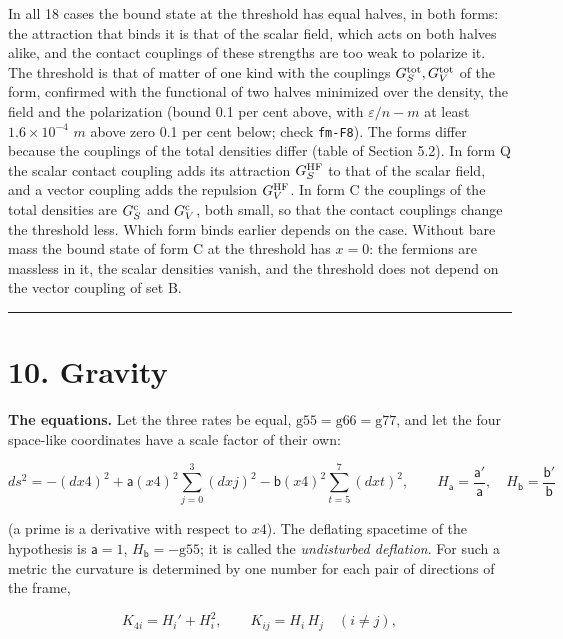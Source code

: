 \documentclass[
  10pt,
]{article}
\begin{document}
In all 18 cases the bound state at the threshold has equal halves, in
both forms: the attraction that binds it is that of the scalar field,
which acts on both halves alike, and the contact couplings of these
strengths are too weak to polarize it. The threshold is that of matter
of one kind with the couplings \(G_S^{\rm tot},G_V^{\rm tot}\) of the
form, confirmed with the functional of two halves minimized over the
density, the field and the polarization (bound 0.1 per cent above, with
\(\varepsilon/n-m\) at least \(1.6\times10^{-4}\) \(m\) above zero 0.1
per cent below; check \texttt{fm-F8}). The forms differ because the
couplings of the total densities differ (table of Section 5.2). In form
Q the scalar contact coupling adds its attraction \(G_S^{\rm HF}\) to
that of the scalar field, and a vector coupling adds the repulsion
\(G_V^{\rm HF}\). In form C the couplings of the total densities are
\(G_S^{\rm c}\) and \(G_V^{\rm c}\), both small, so that the contact
couplings change the threshold less. Which form binds earlier depends on
the case. Without bare mass the bound state of form C at the threshold
has \(x=0\): the fermions are massless in it, the scalar densities
vanish, and the threshold does not depend on the vector coupling of set
B.

\begin{center}\rule{0.5\linewidth}{0.5pt}\end{center}

\hypertarget{gravity}{%
\section{10. Gravity}\label{gravity}}

\textbf{The equations.} Let the three rates be equal,
\(\mathrm{g55}=\mathrm{g66}=\mathrm{g77}\), and let the four space-like
coordinates have a scale factor of their own:

\[ds^2=-(dx4)^2+\mathsf a(x4)^2\sum_{j=0}^{3}(dxj)^2-\mathsf b(x4)^2\sum_{t=5}^{7}(dxt)^2,\qquad
H_{\mathsf a}=\frac{\mathsf a'}{\mathsf a},\quad H_{\mathsf b}=\frac{\mathsf b'}{\mathsf b}\tag{10.1}\]

(a prime is a derivative with respect to \(x4\)). The deflating
spacetime of the hypothesis is \(\mathsf a=1\),
\(H_{\mathsf b}=-\mathrm{g55}\); it is called the \emph{undisturbed
deflation}. For such a metric the curvature is determined by one number
for each pair of directions of the frame,

\[K_{4i}=H_i'+H_i^2,\qquad K_{ij}=H_i\,H_j\quad(i\neq j),\tag{10.2}\]
\end{document}

